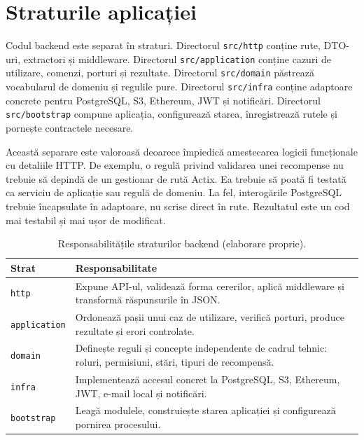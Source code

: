 \section{Straturile aplicației}
Codul backend este separat în straturi. Directorul \texttt{src/http} conține rute, DTO-uri, extractori și middleware. Directorul \texttt{src/application} conține cazuri de utilizare, comenzi, porturi și rezultate. Directorul \texttt{src/domain} păstrează vocabularul de domeniu și regulile pure. Directorul \texttt{src/infra} conține adaptoare concrete pentru PostgreSQL, S3, Ethereum, JWT și notificări. Directorul \texttt{src/bootstrap} compune aplicația, configurează starea, înregistrează rutele și pornește contractele necesare.

Această separare este valoroasă deoarece împiedică amestecarea logicii funcționale cu detaliile HTTP. De exemplu, o regulă privind validarea unei recompense nu trebuie să depindă de un gestionar de rută Actix. Ea trebuie să poată fi testată ca serviciu de aplicație sau regulă de domeniu. La fel, interogările PostgreSQL trebuie încapsulate în adaptoare, nu scrise direct în rute. Rezultatul este un cod mai testabil și mai ușor de modificat.

\begin{table}[H]
    \centering
    \caption{Responsabilitățile straturilor backend (elaborare proprie).}
    \label{tab:straturi_backend}
    \begin{tabular}{P{3.2cm}P{10.2cm}}
        \toprule
        Strat & Responsabilitate \\
        \midrule
        \texttt{http} & Expune API-ul, validează forma cererilor, aplică middleware și transformă răspunsurile în JSON. \\
        \texttt{application} & Ordonează pașii unui caz de utilizare, verifică porturi, produce rezultate și erori controlate. \\
        \texttt{domain} & Definește reguli și concepte independente de cadrul tehnic: roluri, permisiuni, stări, tipuri de recompensă. \\
        \texttt{infra} & Implementează accesul concret la PostgreSQL, S3, Ethereum, JWT, e-mail local și notificări. \\
        \texttt{bootstrap} & Leagă modulele, construiește starea aplicației și configurează pornirea procesului. \\
        \bottomrule
    \end{tabular}
\end{table}

